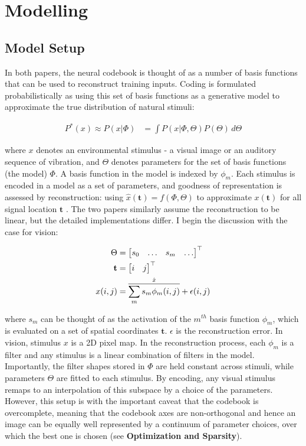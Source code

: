 \documentclass[
	a4paper, %
	11pt, %
	unnumberedsections, %
]{LTJournalArticle}
\begin{document}
\section{Modelling}
\subsection{Model Setup}%
  \label{sub:Model Setup}
  
In both papers, the neural codebook is thought of as a number of basis functions that can be used to reconstruct training inputs. Coding is formulated probabilistically as using this set of basis functions as a generative model to approximate the true distribution of natural stimuli: 
\begin{center}
\begin{align}
  \label{Eq1}
  P^*(x) \approx P(x|\Phi)  & = \int P(x|\Phi, \Theta)P(\Theta) \, d\Theta  
\end{align}
\end{center}
where $x$ denotes an environmental stimulus - a visual image or an auditory sequence of vibration, and $\Theta$ denotes parameters for the set of basis functions (the model) $\Phi$. A basis function in the model is indexed by $\phi_m$. Each stimulus is encoded in a model as a set of parameters, and goodness of representation is assessed by reconstruction: using $\hat{x}(\mathbf{t}) = f(\Phi, \Theta)$ to approximate $x(\mathbf{t})$ for all signal location $\mathbf{t}$ . The two papers similarly assume the reconstruction to be linear, but the detailed implementations differ. I begin the discussion with the case for vision:
\begin{center}
  \begin{align}
    \Theta &= \begin{bmatrix}
      s_0 & \dots & s_m & \dots
    \end{bmatrix}^{\top}\notag\\
    \mathbf{t} &= \begin{bmatrix}
      i & j
    \end{bmatrix}^{\top}\notag\\
    x(i, j) &= \overset{\hat{x}}{\overline{\sum_m s_m \phi_m(i, j)}} + \epsilon(i, j)\label{Eq2}
  \end{align}
\end{center}
where $s_m$ can be thought of as the activation of the $m^{th}$ basis function $\phi_m$, which is evaluated on a set of spatial coordinates $\mathbf{t}$. $\epsilon$ is the reconstruction error. In vision, stimulus $x$ is a 2D pixel map. In the reconstruction process, each $\phi_m$ is a filter and any stimulus is a linear combination of filters in the model. Importantly, the filter shapes stored in $\Phi$ are held constant across stimuli, while parameters $\Theta$ are fitted to each stimulus. By encoding, any visual stimulus remaps to an interpolation of this subspace by a choice of the parameters. However, this setup is with the important caveat that the codebook is overcomplete, meaning that the codebook axes are non-orthogonal and hence an image can be equally well represented by a continuum of parameter choices, over which the best one is chosen (see \textbf{Optimization and Sparsity}).\\
\end{document}

